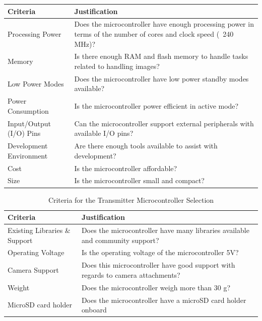 \documentclass[class=report,11pt,crop=false]{standalone}
\begin{document}
\begin{table}[h]
\centering
\begin{tabular}{|l|p{10cm}|}
\hline
\textbf{Criteria} & \textbf{Justification} \\
\hline
Processing Power & Does the microcontroller have enough processing power in terms of the number of cores and clock speed (~240 MHz)? \\
\hline
Memory & Is there enough RAM and flash memory to handle tasks related to handling images? \\
\hline
Low Power Modes & Does the microcontroller have low power standby modes available? \\
\hline
Power Consumption & Is the microcontroller power efficient in active mode? \\
\hline
Input/Output (I/O) Pins & Can the microcontroller support external peripherals with available I/O pins? \\
\hline
Development Environment & Are there enough tools available to assist with development? \\
\hline
Cost & Is the microcontroller affordable? \\
\hline
Size & Is the microcontroller small and compact? \\
\hline
\end{tabular}
\label{tab:HW_CT_Criteria_1}
\end{table}

\begin{table}[h]
\centering
\begin{tabular}{|l|p{10cm}|}
\hline
\textbf{Criteria} & \textbf{Justification} \\
\hline
Existing Libraries \& Support & Does the microcontroller have many libraries available and community support? \\
\hline
Operating Voltage & Is the operating voltage of the microcontroller 5V? \\
\hline
Camera Support & Does this microcontroller have good support with regards to camera attachments? \\
\hline
Weight & Does the microcontroller weigh more than 30 g? \\
\hline
MicroSD card holder & Does the microcontroller have a microSD card holder onboard \\
\hline
\end{tabular}
\caption{Criteria for the Transmitter Microcontroller Selection}
\label{tab:HW_CT_Criteria_2}
\end{table}
\end{document}
